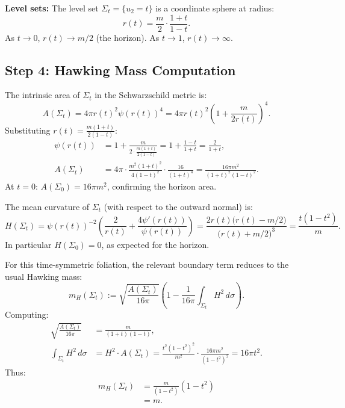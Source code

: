 \textbf{Level sets:} The level set $\Sigma_t = \{u_2 = t\}$ is a coordinate sphere at radius:
\begin{equation}
    r(t) = \frac{m}{2} \cdot \frac{1+t}{1-t}.
\end{equation}
As $t \to 0$, $r(t) \to m/2$ (the horizon). As $t \to 1$, $r(t) \to \infty$.

\subsection{Step 4: Hawking Mass Computation}
The intrinsic area of $\Sigma_t$ in the Schwarzschild metric is:
\begin{equation}
    A(\Sigma_t) = 4\pi r(t)^2 \psi(r(t))^4 = 4\pi r(t)^2 \left(1 + \frac{m}{2r(t)}\right)^4.
\end{equation}
Substituting $r(t) = \frac{m(1+t)}{2(1-t)}$:
\begin{align}
    \psi(r(t)) &= 1 + \frac{m}{2 \cdot \frac{m(1+t)}{2(1-t)}} = 1 + \frac{1-t}{1+t} = \frac{2}{1+t}, \\
    A(\Sigma_t) &= 4\pi \cdot \frac{m^2(1+t)^2}{4(1-t)^2} \cdot \frac{16}{(1+t)^4} = \frac{16\pi m^2}{(1+t)^2(1-t)^2}.
\end{align}
At $t = 0$: $A(\Sigma_0) = 16\pi m^2$, confirming the horizon area.

The mean curvature of $\Sigma_t$ (with respect to the outward normal) is:
\begin{equation}
    H(\Sigma_t) = \psi(r(t))^{-2}\left(\frac{2}{r(t)} + \frac{4\psi'(r(t))}{\psi(r(t))}\right) = \frac{2r(t)\bigl(r(t)-m/2\bigr)}{\bigl(r(t)+m/2\bigr)^3} = \frac{t(1-t^2)}{m}.
\end{equation}
In particular $H(\Sigma_0)=0$, as expected for the horizon.

For this time-symmetric foliation, the relevant boundary term reduces to the usual Hawking mass:
\begin{equation}
    m_H(\Sigma_t) := \sqrt{\frac{A(\Sigma_t)}{16\pi}} \left( 1 - \frac{1}{16\pi} \int_{\Sigma_t} H^2 \, d\sigma \right).
\end{equation}
Computing:
\begin{align}
    \sqrt{\frac{A(\Sigma_t)}{16\pi}} &= \frac{m}{(1+t)(1-t)}, \\
    \int_{\Sigma_t} H^2 \, d\sigma &= H^2 \cdot A(\Sigma_t) = \frac{t^2(1-t^2)^2}{m^2} \cdot \frac{16\pi m^2}{(1-t^2)^2} = 16\pi t^2.
\end{align}
Thus:
\begin{align}
    m_H(\Sigma_t) &= \frac{m}{(1-t^2)} \left( 1 - t^2 \right) \\
    &= m.
\end{align}

